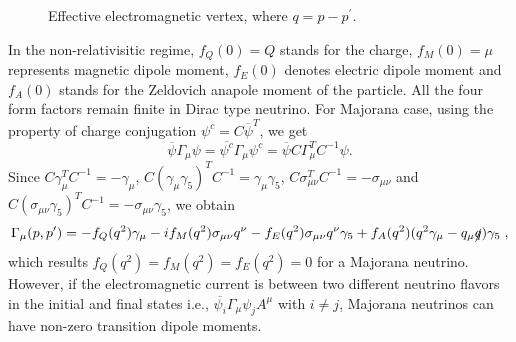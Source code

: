 \documentclass[aps, a4paper,superscriptaddress,12pt,preprintnumbers,floatfix,nofootinbib,amsmath,amssymb]{revtex4}
\newcommand{\red}[1]{\textcolor{red}{#1}}
\begin{document}
\begin{figure}
  \centering
  \caption{Effective electromagnetic vertex, where $q = p-p^\prime$.  }
  \label{emvtx_feyn}
\end{figure}
In the non-relativisitic regime, $f_Q(0)=Q$ stands for the charge, $f_M(0)=\mu$ represents magnetic dipole moment, $f_E(0)$ denotes electric dipole moment and $f_A(0)$ stands for the Zeldovich anapole moment of the particle. All the four form factors remain finite in Dirac type neutrino. For Majorana case, using the property of charge conjugation $\psi^c =  C\overline{\psi}^T$, we get
\begin{equation}
\overline{\psi}\Gamma_\mu \psi = \overline{\psi^c}\Gamma_\mu \psi^c = \overline{\psi}C\Gamma_\mu^T C^{-1} \psi.
\end{equation}
Since $C\gamma_\mu^T C^{-1}=-\gamma_\mu$, $C(\gamma_\mu \gamma_5)^T C^{-1} = \gamma_\mu \gamma_5$, $C\sigma_{\mu\nu}^T C^{-1} = -\sigma_{\mu\nu}$ and $C(\sigma_{\mu\nu}\gamma_5)^T C^{-1} = -\sigma_{\mu\nu}\gamma_5$, we obtain
\begin{equation}
\Gamma_\mu (p,p^\prime) =  -f_Q(q^2)\gamma_\mu - if_M(q^2)\sigma_{\mu\nu}q^\nu - f_E(q^2) \sigma_{\mu\nu}q^\nu \gamma_5 + f_A(q^2) (q^2\gamma_\mu - q_\mu\slashed{q})\gamma_5\;,
\end{equation}
which results $f_Q(q^2) = f_M(q^2) = f_E(q^2) = 0$ for a Majorana neutrino. However, if the electromagnetic current is between two different neutrino flavors in the initial and final states i.e., $\overline{\psi_i}\Gamma_\mu \psi_j A^\mu$ with $i\neq j$, Majorana neutrinos can have non-zero transition dipole moments. 
\end{document}
